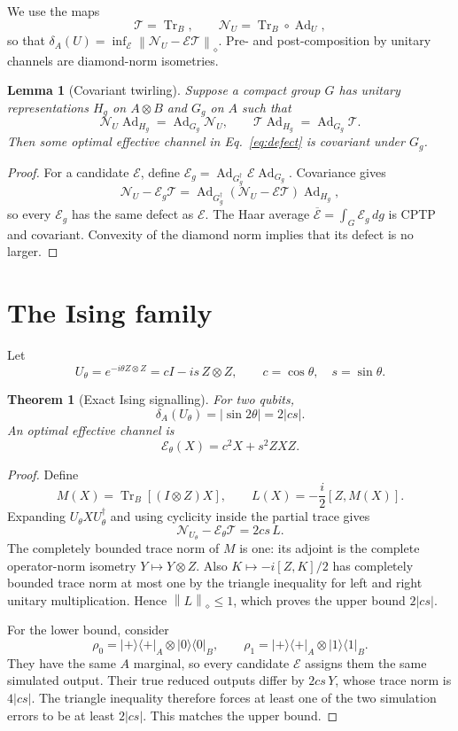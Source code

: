 \documentclass[11pt,a4paper]{article}
\newtheorem{theorem}{Theorem}
\newtheorem{lemma}{Lemma}
\theoremstyle{remark}
\newcommand{\Tr}{\operatorname{Tr}}
\newcommand{\Ad}{\operatorname{Ad}}
\newcommand{\cE}{\mathcal{E}}
\newcommand{\cN}{\mathcal{N}}
\newcommand{\cT}{\mathcal{T}}
\newcommand{\diamondnorm}[1]{\left\lVert #1\right\rVert_{\diamond}}
\begin{document}
We use the maps
\[
 \cT=\Tr_B,\qquad \cN_U=\Tr_B\circ\Ad_U,
\]
so that $\delta_A(U)=\inf_\cE\diamondnorm{\cN_U-\cE\cT}$.
Pre- and post-composition by unitary channels are diamond-norm isometries.

\begin{lemma}[Covariant twirling]
\label{lem:twirl}
Suppose a compact group $G$ has unitary representations $H_g$ on $A\otimes B$
and $G_g$ on $A$ such that
\[
 \cN_U\Ad_{H_g}=\Ad_{G_g}\cN_U,\qquad
 \cT\Ad_{H_g}=\Ad_{G_g}\cT.
\]
Then some optimal effective channel in Eq.~\eqref{eq:defect} is covariant under
$G_g$.
\end{lemma}

\begin{proof}
For a candidate $\cE$, define
$\cE_g=\Ad_{G_g^\dagger}\cE\Ad_{G_g}$.  Covariance gives
\[
 \cN_U-\cE_g\cT
 =\Ad_{G_g^\dagger}(\cN_U-\cE\cT)\Ad_{H_g},
\]
so every $\cE_g$ has the same defect as $\cE$.  The Haar average
$\overline{\cE}=\int_G\cE_g\,dg$ is CPTP and covariant.  Convexity of the
diamond norm implies that its defect is no larger.
\end{proof}

\section{The Ising family}

Let
\[
 U_\theta=e^{-i\theta Z\otimes Z}
          =cI-is\,Z\otimes Z,\qquad c=\cos\theta,\quad s=\sin\theta.
\]

\begin{theorem}[Exact Ising signalling]
\label{thm:ising}
For two qubits,
\begin{equation}
 \delta_A(U_\theta)=|\sin 2\theta|=2|cs|.
 \label{eq:ising-result}
\end{equation}
An optimal effective channel is
\[
 \cE_\theta(X)=c^2X+s^2ZXZ.
\]
\end{theorem}

\begin{proof}
Define
\[
 M(X)=\Tr_B[(I\otimes Z)X],\qquad
 L(X)=-\frac{i}{2}[Z,M(X)].
\]
Expanding $U_\theta XU_\theta^\dagger$ and using cyclicity inside the partial
trace gives
\begin{equation}
 \cN_{U_\theta}-\cE_\theta\cT
 =2cs\,L.
 \label{eq:ising-factor}
\end{equation}
The completely bounded trace norm of $M$ is one: its adjoint is the complete
operator-norm isometry $Y\mapsto Y\otimes Z$.  Also
$K\mapsto-i[Z,K]/2$ has completely bounded trace norm at most one by the
triangle inequality for left and right unitary multiplication.  Hence
$\diamondnorm{L}\leq1$, which proves the upper bound $2|cs|$.

For the lower bound, consider
\[
 \rho_0=|+\rangle\langle+|_A\otimes|0\rangle\langle0|_B,\qquad
 \rho_1=|+\rangle\langle+|_A\otimes|1\rangle\langle1|_B.
\]
They have the same $A$ marginal, so every candidate $\cE$ assigns them the
same simulated output.  Their true reduced outputs differ by $2cs\,Y$, whose
trace norm is $4|cs|$.  The triangle inequality therefore forces at least one
of the two simulation errors to be at least $2|cs|$.  This matches the upper
bound.
\end{proof}
\end{document}
